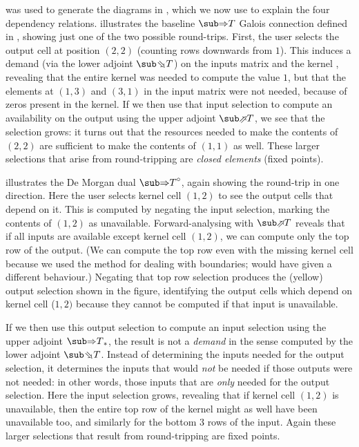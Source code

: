 

\OurLanguage{} was used to generate the diagrams in , which we now use to explain the four dependency relations.  illustrates the baseline $\evalGC{T}$ Galois connection defined in , showing just one of the two possible round-trips. First, the user selects the output cell at position $(2,2)$ (counting rows downwards from $1$). This induces a demand (via the lower adjoint $\evalBwdF{T}$) on the inputs matrix  and the kernel , revealing that the entire kernel was needed to compute the value $1$, but that the elements at $(1,3)$ and $(3,1)$ in the input matrix were not needed, because of zeros present in the kernel. If we then use that input selection to  compute an availability on the output using the upper adjoint $\evalFwdF{T}$, we see that the selection grows: it turns out that the resources needed to make the contents of $(2,2)$ are sufficient to make the contents of $(1,1)$ as well. These larger selections that arise from round-tripping are \emph{closed elements} (fixed points).

 illustrates the De Morgan dual $\dual{\evalGC{T}}$, again showing the round-trip in one direction. Here the user selects kernel cell $(1, 2)$ to see the output cells that depend on it. This is computed by negating the input selection, marking the contents of $(1, 2)$ as unavailable. Forward-analysing with $\evalFwdF{T}$ reveals that if all inputs are available except kernel cell $(1, 2)$, we can compute only the top row of the output. (We can compute the top row even with the missing kernel cell because we used the method  for dealing with boundaries;  would have given a different behaviour.) Negating that top row selection produces the (yellow) output selection shown in the figure, identifying the output cells which depend on kernel cell ($1, 2)$ because they cannot be computed if that input is unavailable.

If we then use this output selection to compute an input selection using the upper adjoint $\upperAdj{\evalGC{T}}$, the result is not a \emph{demand} in the sense computed by the lower adjoint $\evalBwdF{T}$. Instead of determining the inputs needed for the output selection, it determines the inputs that would \emph{not} be needed if those outputs were not needed: in other words, those inputs that are \emph{only} needed for the output selection. Here the input selection grows, revealing that if kernel cell $(1, 2)$ is unavailable, then the entire top row of the kernel might as well have been unavailable too, and similarly for the bottom 3 rows of the input. Again these larger selections that result from round-tripping are fixed points.

